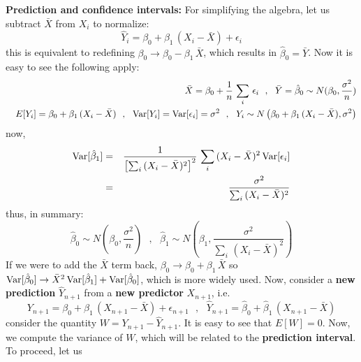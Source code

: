 \documentclass[aps,prl,preprint,superscriptaddress]{revtex4-1}
\begin{document}
{\bf Prediction and confidence intervals:} For simplifying the algebra, let us subtract ${\bar X}$ from $X_i$
to normalize:
%
\begin{equation}
{\hat Y}_i = \beta_0 + \beta_1\, (X_i - {\bar X}) + \epsilon_i
\end{equation}
%
this is equivalent to redefining $\beta_0 \rightarrow \beta_0 - \beta_1\, {\bar X}$, which results in
${\hat \beta}_0 = {\bar Y}$. Now it is easy to see the following apply:
%
\begin{eqnarray}
&& {\bar X} = \beta_0 + \frac{1}{n}\, \sum_i\, \epsilon_i \,\,\,\, , \,\,\,\, 
{\bar Y} = {\hat \beta}_0 \sim N(\beta_0, \frac{\sigma^2}{n}) \nonumber\\
&& E[Y_i] = \beta_0 + \beta_1\, (X_i - {\bar X}) \,\,\,\, , \,\,\,\, {\rm Var}[Y_i] = {\rm Var}[\epsilon_i] = \sigma^2 \,\,\,\, , \,\,\,\,
   Y_i \sim N\left( \beta_0 + \beta_1\, ( X_i - {\bar X}), \sigma^2 \right) \nonumber\\ 
\end{eqnarray}
%
now, 
%
\begin{eqnarray}
{\rm Var}[{\hat \beta}_1] &=& \frac{1}{\left[ \sum_i\, (X_i - {\bar X})^2  \right]^2 }\, 
    \sum_i\, (X_i - {\bar X})^2\, {\rm Var}[\epsilon_i] \nonumber\\
                          &=& \frac{\sigma^2}{\sum_i\, (X_i - {\bar X})^2} \nonumber\\  
\end{eqnarray}
%
thus, in summary:
%
\begin{equation}
\boxed{ {\hat \beta}_0 \sim N\left( \beta_0, \frac{\sigma^2}{n} \right) \,\,\,\, , \,\,\,\,
        {\hat \beta}_1 \sim N\left( \beta_1, \frac{\sigma^2}{\sum_i\, (X_i - {\bar X})^2} \right)  }
\end{equation}
%
If we were to add the ${\bar X}$ term back, $\beta_0 \rightarrow \beta_0 + \beta_1\, {\bar X}$ so 
${\rm Var}[{\hat \beta}_0] \rightarrow {\bar X}^2\, {\rm Var}[{\hat \beta}_1] + {\rm Var}[{\hat \beta}_0]$,
which is more widely used.
%
Now, consider a {\bf new prediction} ${\hat Y}_{n+1}$ from a {\bf new predictor} $X_{n+1}$, i.e.
%
\begin{equation}
Y_{n+1} = \beta_0 + \beta_1\, (X_{n+1} - {\bar X}) + \epsilon_{n+1} \,\,\,\, , \,\,\,\,
{\hat Y}_{n+1} = {\hat \beta}_0 + {\hat \beta}_1\, (X_{n+1} - {\bar X})
\end{equation}
%
consider the quantity $W = Y_{n+1} - {\hat Y}_{n+1}$. It is easy to see that $E[W] = 0$. Now, we compute the 
variance of $W$, which will be related to the {\bf prediction interval}. To proceed, let us
\end{document}
